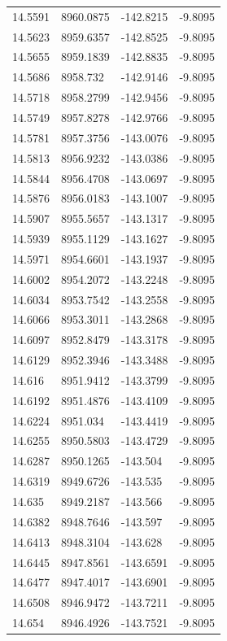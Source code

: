 \begin{table}[H]
\begin{tabular}{llll}
14.5591 & 8960.0875 & -142.8215 & -9.8095 \\
14.5623 & 8959.6357 & -142.8525 & -9.8095 \\
14.5655 & 8959.1839 & -142.8835 & -9.8095 \\
14.5686 & 8958.732 & -142.9146 & -9.8095 \\
14.5718 & 8958.2799 & -142.9456 & -9.8095 \\
14.5749 & 8957.8278 & -142.9766 & -9.8095 \\
14.5781 & 8957.3756 & -143.0076 & -9.8095 \\
14.5813 & 8956.9232 & -143.0386 & -9.8095 \\
14.5844 & 8956.4708 & -143.0697 & -9.8095 \\
14.5876 & 8956.0183 & -143.1007 & -9.8095 \\
14.5907 & 8955.5657 & -143.1317 & -9.8095 \\
14.5939 & 8955.1129 & -143.1627 & -9.8095 \\
14.5971 & 8954.6601 & -143.1937 & -9.8095 \\
14.6002 & 8954.2072 & -143.2248 & -9.8095 \\
14.6034 & 8953.7542 & -143.2558 & -9.8095 \\
14.6066 & 8953.3011 & -143.2868 & -9.8095 \\
14.6097 & 8952.8479 & -143.3178 & -9.8095 \\
14.6129 & 8952.3946 & -143.3488 & -9.8095 \\
14.616 & 8951.9412 & -143.3799 & -9.8095 \\
14.6192 & 8951.4876 & -143.4109 & -9.8095 \\
14.6224 & 8951.034 & -143.4419 & -9.8095 \\
14.6255 & 8950.5803 & -143.4729 & -9.8095 \\
14.6287 & 8950.1265 & -143.504 & -9.8095 \\
14.6319 & 8949.6726 & -143.535 & -9.8095 \\
14.635 & 8949.2187 & -143.566 & -9.8095 \\
14.6382 & 8948.7646 & -143.597 & -9.8095 \\
14.6413 & 8948.3104 & -143.628 & -9.8095 \\
14.6445 & 8947.8561 & -143.6591 & -9.8095 \\
14.6477 & 8947.4017 & -143.6901 & -9.8095 \\
14.6508 & 8946.9472 & -143.7211 & -9.8095 \\
14.654 & 8946.4926 & -143.7521 & -9.8095 \\

\end{tabular}
\end{table}
